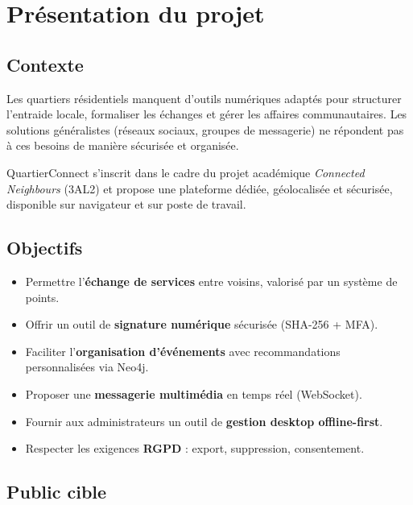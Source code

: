 \documentclass[12pt,a4paper]{article}
\begin{document}
\section{Présentation du projet}

\subsection{Contexte}

Les quartiers résidentiels manquent d'outils numériques adaptés pour structurer
l'entraide locale, formaliser les échanges et gérer les affaires communautaires.
Les solutions généralistes (réseaux sociaux, groupes de messagerie) ne répondent
pas à ces besoins de manière sécurisée et organisée.

QuartierConnect s'inscrit dans le cadre du projet académique
\textit{Connected Neighbours} (3AL2) et propose une plateforme dédiée,
géolocalisée et sécurisée, disponible sur navigateur et sur poste de travail.

\subsection{Objectifs}

\begin{itemize}
    \item Permettre l'\textbf{échange de services} entre voisins, valorisé par un
          système de points.
    \item Offrir un outil de \textbf{signature numérique} sécurisée (SHA-256 + MFA).
    \item Faciliter l'\textbf{organisation d'événements} avec recommandations
          personnalisées via Neo4j.
    \item Proposer une \textbf{messagerie multimédia} en temps réel (WebSocket).
    \item Fournir aux administrateurs un outil de \textbf{gestion desktop offline-first}.
    \item Respecter les exigences \textbf{RGPD} : export, suppression, consentement.
\end{itemize}

\subsection{Public cible}
\end{document}
